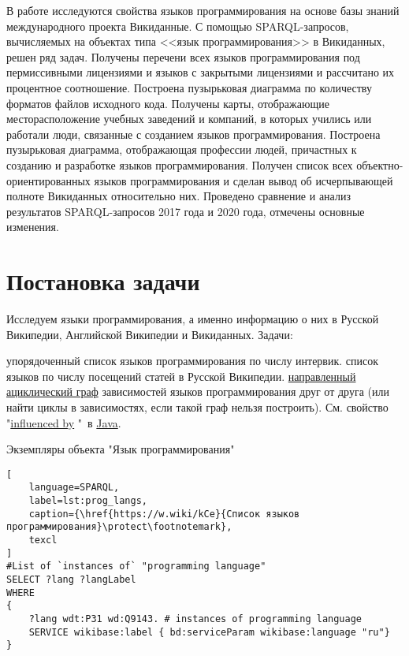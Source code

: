 В работе исследуются свойства языков программирования на основе базы знаний международного проекта Викиданные. С помощью SPARQL-запросов, вычисляемых на объектах типа <<язык программирования>>  в Викиданных, решен ряд задач. Получены перечени всех языков программирования под пермиссивными лицензиями и языков с закрытыми лицензиями и рассчитано их процентное соотношение. Построена пузырьковая диаграмма по количеству форматов файлов исходного кода. Получены карты, отображающие месторасположение учебных заведений и компаний, в которых учились или работали люди, связанные с созданием языков программирования. Построена пузырьковая диаграмма, отображающая профессии людей, причастных к созданию и разработке языков программирования. Получен список всех объектно-ориентированных языков программирования и сделан вывод об исчерпывающей полноте Викиданных относительно них. Проведено сравнение и анализ результатов SPARQL-запросов 2017 года и 2020 года, отмечены основные изменения. 

\section{Постановка задачи}
Исследуем языки программирования, а именно информацию о них в Русской Википедии, Английской Википедии и Викиданных.
Задачи:
\begin{enumerate} 
   упорядоченный список языков программирования по числу интервик.
   список языков по числу посещений статей в Русской Википедии.
   \href{https://en.wikipedia.org/wiki/Directed_acyclic_graph}{направленный ациклический граф} зависимостей языков программирования друг от друга (или найти циклы в зависимостях, если такой граф нельзя построить). См. свойство "\href{https://www.wikidata.org/wiki/Property:P737}{influenced by}
"\  в \href{https://www.wikidata.org/wiki/Q251}{Java}.
\end{enumerate}

Экземпляры объекта "Язык программирования"

\begin{lstlisting}[
	language=SPARQL,
	label=lst:prog_langs,
	caption={\href{https://w.wiki/kCe}{Список языков программирования}\protect\footnotemark},
	texcl 
]
#List of `instances of` "programming language" 
SELECT ?lang ?langLabel
WHERE
{
    ?lang wdt:P31 wd:Q9143. # instances of programming language
    SERVICE wikibase:label { bd:serviceParam wikibase:language "ru"}
}
\end{lstlisting}

